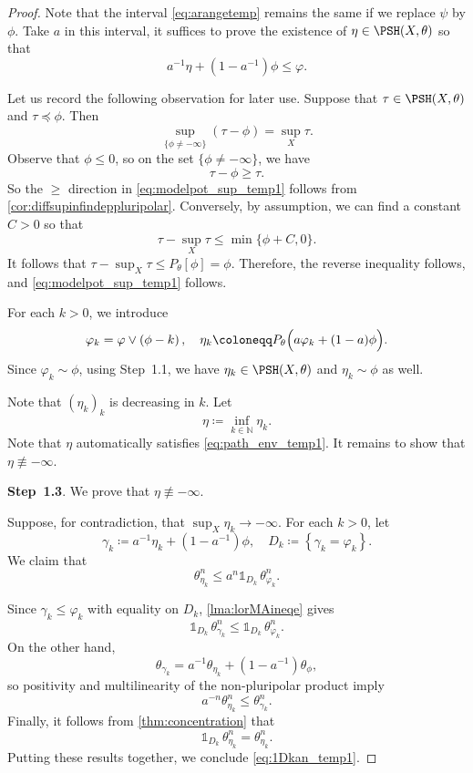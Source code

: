 \begin{proof}
    Note that the interval \eqref{eq:arangetemp} remains the same if we replace $\psi$ by $\phi$. Take $a$ in this interval, it suffices to prove the existence of $\eta\in \PSH(X,\theta)$ so that
    \begin{equation}\label{eq:path_env_temp1}
    a^{-1}\eta+\left(1-a^{-1}\right)\phi\leq \varphi.
    \end{equation}

    Let us record the following observation for later use. Suppose that $\tau\in \PSH(X,\theta)$ and $\tau\preceq \phi$. Then
    \begin{equation}\label{eq:modelpot_sup_temp1}
        \sup_{\{\phi\neq -\infty\}} (\tau-\phi)=\sup_X \tau.
    \end{equation}
    Observe that $\phi\leq 0$, so on the set $\{\phi\neq -\infty\}$, we have
    \[
    \tau-\phi\geq \tau.
    \]
    So the $\geq$ direction in \eqref{eq:modelpot_sup_temp1} follows from \cref{cor:diffsupinfindeppluripolar}.
    Conversely, by assumption, we can find a constant $C>0$ so that
    \[
    \tau-\sup_X \tau\leq \min\{\phi+C,0 \}.
    \]
    It follows that $\tau-\sup_X \tau\leq P_{\theta}[\phi]=\phi$. Therefore, the reverse inequality follows, and \eqref{eq:modelpot_sup_temp1} follows.

    For each $k>0$, we introduce
    \[
    \varphi_k=\varphi\lor \left(\phi-k\right),\quad \eta_k\coloneqq P_{\theta}\Bigl( a \varphi_k+(1-a)\phi \Bigr).
    \]
    Since $\varphi_k\sim \phi$, using Step~1.1, we have $\eta_k\in \PSH(X,\theta)$ and $\eta_k\sim \phi$ as well.

    Note that $(\eta_k)_k$ is decreasing in $k$. Let
    \[
    \eta\coloneqq \inf_{k\in \mathbb{N}} \eta_k.
    \]
    Note that $\eta$ automatically satisfies \eqref{eq:path_env_temp1}.
    It remains to show that $\eta\not\equiv -\infty$.

    \textbf{Step~1.3}. We prove that $\eta\not\equiv -\infty$.

    Suppose, for contradiction, that $\sup_X \eta_k\to -\infty$. For each $k>0$, let
    \[
    \gamma_k\coloneqq a^{-1}\eta_k+\left(1-a^{-1}\right)\phi,\quad D_k\coloneqq \left\{\gamma_k=\varphi_k\right\}.
    \]
    We claim that
    \begin{equation}\label{eq:1Dkan_temp1}
        \theta_{\eta_k}^n\leq a^n\mathds{1}_{D_k}\, \theta_{\varphi_k}^n.
    \end{equation}

    Since $\gamma_k\leq \varphi_k$ with equality on $D_k$, \cref{lma:lorMAineqe} gives
    \[
    \mathds{1}_{D_k}\, \theta_{\gamma_k}^n\leq \mathds{1}_{D_k}\, \theta_{\varphi_k}^n.
    \]
    On the other hand,
    \[
    \theta_{\gamma_k}=a^{-1}\theta_{\eta_k}+\left(1-a^{-1}\right)\theta_{\phi},
    \]
    so positivity and multilinearity of the non-pluripolar product imply
    \[
        a^{-n}\theta_{\eta_k}^n\leq \theta_{\gamma_k}^n.
    \]
    Finally, it follows from \cref{thm:concentration} that
    \[
    \mathds{1}_{D_k}\,\theta_{\eta_k}^n=\theta_{\eta_k}^n.
    \]
    Putting these results together, we conclude \eqref{eq:1Dkan_temp1}.





\end{proof}
